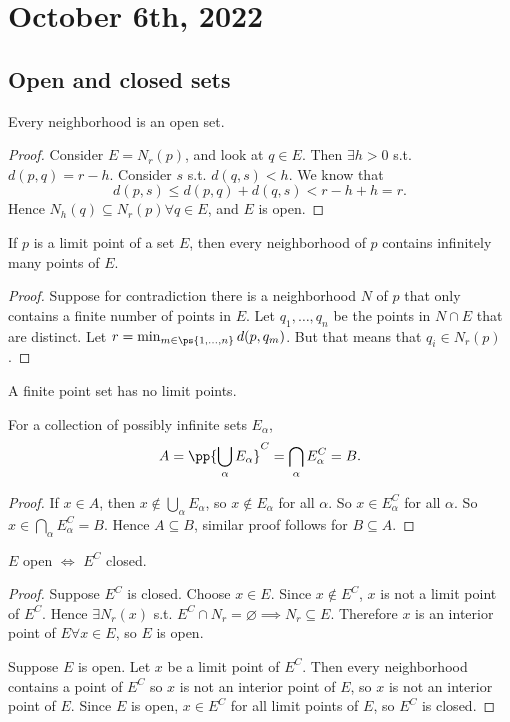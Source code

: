 \documentclass[11pt]{scrartcl}
\numberwithin{equation}{section}
\begin{document}
\clearpage
\section{October 6th, 2022}
\subsection{Open and closed sets}

\begin{theorem}
    \label{thm:nbhdopen}
    Every neighborhood is an open set.
\end{theorem}

\begin{proof}
    Consider $E = N_r(p)$, and look at $q \in E$. Then $\exists h > 0$
    s.t. $d(p,q) = r-h$. Consider $s$ s.t. $d(q,s) < h$.
    We know that 
    \[ d(p,s) \leq d(p,q) + d(q,s) < r-h+h = r.\]
    Hence $N_h(q) \subseteq N_r(p) \forall q \in E$, and $E$ is open.
\end{proof}
\begin{proposition}
    If $p$ is a limit point of a set $E$, then every neighborhood of $p$
    contains infinitely many points of $E$.
\end{proposition}
\begin{proof}
    Suppose for contradiction there is a neighborhood $N$ of $p$ that 
    only contains a finite number of points in $E$. Let $q_1,\dots,q_n$ 
    be the points in $N\cap E$ that are distinct.
    Let $r = \min_{m\in\ps{1,\dots,n}} d(p,q_m)$. But that means 
    that $q_i \in N_r(p)$.
\end{proof}
\begin{corollary}
    A finite point set has no limit points.
\end{corollary}
\begin{theorem}
    For a collection of possibly infinite sets $E_\alpha$,
    \[ A = \pp{\bigcup_\alpha E_\alpha}^C = \bigcap_\alpha E_\alpha^C = B.\]    
\end{theorem}
\begin{proof}
    If $x\in A$, then $x \notin \bigcup_\alpha E_\alpha$, so $x \notin E_\alpha$ for all $\alpha$. So $x\in E_\alpha^C$ for all $\alpha$.
    So $x \in \bigcap_\alpha E_\alpha^C = B$.
    Hence $A\subseteq B$, similar proof follows for $B\subseteq A$.
\end{proof}
\begin{theorem}
    $E$ open $\iff$ $E^C$ closed.
\end{theorem}
\begin{proof}
    Suppose $E^C$ is closed. Choose $x \in E$. Since $x\notin E^C$,
    $x$ is not a limit point of $E^C$. Hence $\exists N_r(x)$ s.t.
    $E^C\cap N_r = \varnothing \implies N_r \subseteq E$. Therefore $x$ is 
    an interior point of $E\forall x \in E$, so $E$ is open.

    Suppose $E$ is open. Let $x$ be a limit point of $E^C$. Then 
    every neighborhood contains a point of $E^C$ so $x$ is not an interior 
    point of $E$, so $x$ is not an interior point of $E$. Since $E$ 
    is open, $x\in E^C$ for all limit points of $E$, so $E^C$ is closed. 
\end{proof}
\end{document}

